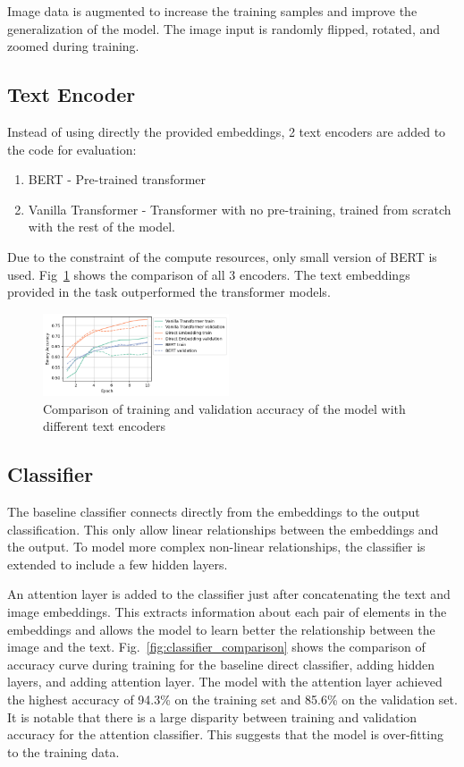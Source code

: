 \documentclass[conference]{IEEEtran}
\begin{document}
Image data is augmented to increase the training samples and improve the generalization of the model. The image input is randomly flipped, rotated, and zoomed during training.

\subsection{Text Encoder}

Instead of using directly the provided embeddings, 2 text encoders are added to the code for evaluation:

\begin{enumerate}
    \item BERT - Pre-trained transformer
    \item Vanilla Transformer - Transformer with no pre-training, trained from scratch with the rest of the model.
\end{enumerate}

Due to the constraint of the compute resources, only small version of BERT is used. Fig~\ref{fig:text_encoder_comparison} shows the comparison of all 3 encoders. The text embeddings provided in the task outperformed the transformer models.

\begin{figure}
    \centering
    \includegraphics[width=0.49\textwidth]{text_encoder_comparison.png}
    \caption{Comparison of training and validation accuracy of the model with different text encoders}
    \label{fig:text_encoder_comparison}
\end{figure}

\subsection{Classifier}

The baseline classifier connects directly from the embeddings to the output classification. This only allow linear relationships between the embeddings and the output. To model more complex non-linear relationships, the classifier is extended to include a few hidden layers.

An attention layer is added to the classifier just after concatenating the text and image embeddings. This extracts information about each pair of elements in the embeddings and allows the model to learn better the relationship between the image and the text. Fig.~\ref{fig:classifier_comparison} shows the comparison of accuracy curve during training for the baseline direct classifier, adding hidden layers, and adding attention layer. The model with the attention layer achieved the highest accuracy of 94.3\% on the training set and 85.6\% on the validation set. It is notable that there is a large disparity between training and validation accuracy for the attention classifier. This suggests that the model is over-fitting to the training data.
\end{document}
